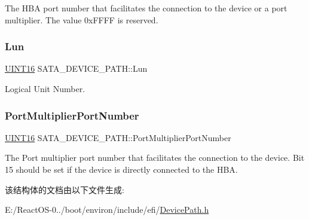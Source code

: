 The H\+BA port number that facilitates the connection to the device or a port multiplier. The value 0x\+F\+F\+FF is reserved. \mbox{\label{struct_s_a_t_a___d_e_v_i_c_e___p_a_t_h_ae702659141f194a79afa54d4afd054a1}} 
\subsubsection{\texorpdfstring{Lun}{Lun}}
{\footnotesize\ttfamily \hyperlink{_processor_bind_8h_a09f1a1fb2293e33483cc8d44aefb1eb1}{U\+I\+N\+T16} S\+A\+T\+A\+\_\+\+D\+E\+V\+I\+C\+E\+\_\+\+P\+A\+T\+H\+::\+Lun}

Logical Unit Number. \mbox{\label{struct_s_a_t_a___d_e_v_i_c_e___p_a_t_h_a78f920246259896f492f169d67ea48bd}} 
\subsubsection{\texorpdfstring{Port\+Multiplier\+Port\+Number}{PortMultiplierPortNumber}}
{\footnotesize\ttfamily \hyperlink{_processor_bind_8h_a09f1a1fb2293e33483cc8d44aefb1eb1}{U\+I\+N\+T16} S\+A\+T\+A\+\_\+\+D\+E\+V\+I\+C\+E\+\_\+\+P\+A\+T\+H\+::\+Port\+Multiplier\+Port\+Number}

The Port multiplier port number that facilitates the connection to the device. Bit 15 should be set if the device is directly connected to the H\+BA. 

该结构体的文档由以下文件生成\+:\begin{DoxyCompactItemize}
\item 
E\+:/\+React\+O\+S-\/0../boot/environ/include/efi/\hyperlink{_device_path_8h}{Device\+Path.\+h}\end{DoxyCompactItemize}
